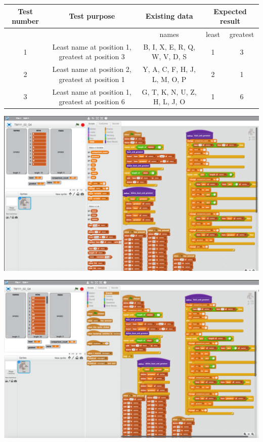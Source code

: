 \documentclass{article}
\begin{document}
\begin{question}

\qpart

\begin{tabular}{|c|c|c|c|c|}
    \hline
    Test number & Test purpose & Existing data & \multicolumn{2}{c|}{Expected result}\\
    \hline
    & & names & least & greatest\\
    \hline
    1 & Least name at position 1, greatest at position 3 & B, I, X, E, R, Q, W, V, D, S & 1 & 3\\
    \hline
    2 & Least name at position 2, greatest at position 1 & Y, A, C, F, H, J, L, M, O, P & 2 & 1\\
    \hline
    3 & Least name at position 1, greatest at position 6 & G, T, K, N, U, Z, H, L, J, O & 1 & 6\\
    \hline
\end{tabular}

\qpart

\includegraphics[scale=0.25]{question_4_b.png}

\qpart
\qsubpart

\includegraphics[scale=0.25]{question_4_c.png}


\end{question}
\end{document}
